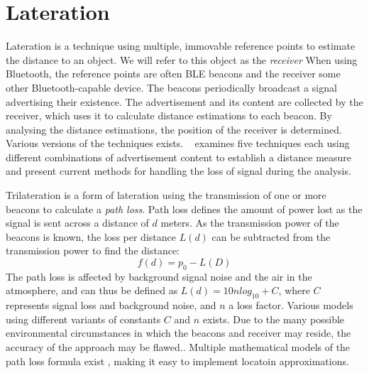 \section{Lateration}
Lateration is a technique using multiple, immovable reference points to estimate the distance to an object\cite{presence_ble_review}.
We will refer to this object as the \textit{receiver}   
When using Bluetooth, the reference points are often BLE beacons and the receiver some other Bluetooth-capable device. 
The beacons periodically broadcast a signal advertising their existence. 
The advertisement and its content are collected by the receiver, which uses it to calculate distance estimations to each beacon. 
By analysing the distance estimations, the position of the receiver is determined.
Various versions of the techniques exists.
\citeauthor{presence_ble_review}~\cite{presence_ble_review} examines five techniques each using different combinations of advertisement content to establish a distance measure and present current methods for handling the loss of signal during the analysis.

Trilateration is a form of lateration using the transmission of one or more beacons to calculate a \textit{path loss}.
Path loss defines the amount of power lost as the signal is sent across a distance of $d$ meters.
As the transmission power of the beacons is known, the loss per distance $L(d)$ can be subtracted from the transmission power to find the distance:\cite{taking_localization_to_the_wild}
\begin{equation}
    f(d) = p_0 - L(D)
\end{equation}
The path loss is affected by background signal noise and the air in the atmosphere, and can thus be defined as $L(d) = 10n log_10+C$, where $C$ represents signal loss and background noise, and $n$ a loss factor. \cite{presence_ble_review}
Various models using different variants of constants $C$ and $n$ exists\cite{path_loss_models}.
Due to the many possible environmental circumstances in which the beacons and receiver may reside, the accuracy of the approach may be flawed.\cite{presence_ble_review}. 
Multiple mathematical models of the path loss formula exist \cite{rssi_indoor_pos,positioning_alg_rssi,RSSI_ZigBee_distance}, making it easy to implement locatoin approximations.